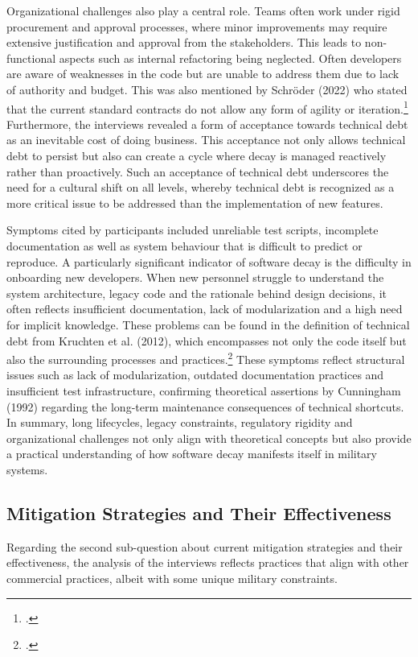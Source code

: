Organizational challenges also play a central role. Teams often work under rigid procurement and approval processes, where minor improvements may require extensive justification and approval from the stakeholders. This leads to non-functional aspects such as internal refactoring being neglected.
Often developers are aware of weaknesses in the code but are unable to address them due to lack of authority and budget. This was also mentioned by Schröder (2022) who stated that the current standard contracts do not allow any form of agility or iteration.\footcite{schroederUngeeignetFuerAgile2022}\\
Furthermore, the interviews revealed a form of acceptance towards technical debt as an inevitable cost of doing business. This acceptance not only allows technical debt to persist but also can create a cycle where decay is managed reactively rather than proactively.
Such an acceptance of technical debt underscores the need for a cultural shift on all levels, whereby technical debt is recognized as a more critical issue to be addressed than the implementation of new features.

Symptoms cited by participants included unreliable test scripts, incomplete documentation as well as system behaviour that is difficult to predict or reproduce. A particularly significant indicator of software decay is the difficulty in onboarding new developers. When new personnel struggle to understand
the system architecture, legacy code and the rationale behind design decisions, it often reflects insufficient documentation, lack of modularization and a high need for implicit knowledge. These problems can be found in the  definition of technical debt from Kruchten et al. (2012), which encompasses not only the code itself but also the surrounding processes and practices.\footcite[19-20]{kruchtenTechnicalDebtMetaphor2012}
These symptoms reflect structural issues such as lack of modularization, outdated documentation practices and insufficient test infrastructure, confirming theoretical assertions by Cunningham (1992) regarding the long-term maintenance consequences of technical shortcuts.\\

In summary, long lifecycles, legacy constraints, regulatory rigidity and organizational challenges not only align with theoretical concepts but also provide a practical understanding of how software decay manifests itself in military systems.

\subsection{Mitigation Strategies and Their Effectiveness}
Regarding the second sub-question about current mitigation strategies and their effectiveness, the analysis of the interviews reflects practices that align with other commercial practices, albeit with some unique military constraints.

